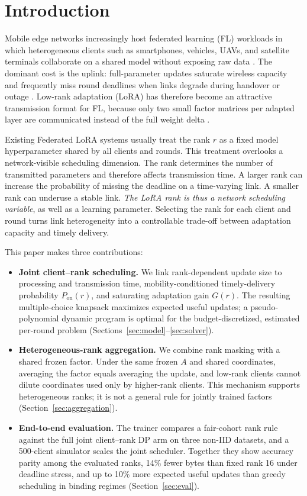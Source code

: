 \documentclass[conference]{IEEEtran}
\begin{document}
\section{Introduction}
\label{sec:intro}

Mobile edge networks increasingly host federated learning (FL) workloads in which heterogeneous clients such as smartphones, vehicles, UAVs, and satellite terminals collaborate on a shared model without exposing raw data \cite{mcmahan2017fedavg,liu2018sagin,mahboob2024ntn}. The dominant cost is the uplink: full-parameter updates saturate wireless capacity and frequently miss round deadlines when links degrade during handover or outage \cite{razmi2022ground,tang2023flsagin,qin2024dfrl,ribero2023intermittent}. Low-rank adaptation (LoRA) has therefore become an attractive transmission format for FL, because only two small factor matrices per adapted layer are communicated instead of the full weight delta \cite{hu2022lora,babakniya2023slora,zhang2024fedit}.

Existing Federated LoRA systems usually treat the rank $r$ as a fixed model hyperparameter shared by all clients and rounds. This treatment overlooks a network-visible scheduling dimension. The rank determines the number of transmitted parameters and therefore affects transmission time. A larger rank can increase the probability of missing the deadline on a time-varying link. A smaller rank can underuse a stable link. \emph{The LoRA rank is thus a network scheduling variable}, as well as a learning parameter. Selecting the rank for each client and round turns link heterogeneity into a controllable trade-off between adaptation capacity and timely delivery.

This paper makes three contributions:
\begin{itemize}
\item \textbf{Joint client--rank scheduling.} We link rank-dependent update size to processing and transmission time, mobility-conditioned timely-delivery probability $P_{\mathrm{on}}(r)$, and saturating adaptation gain $G(r)$. The resulting multiple-choice knapsack maximizes expected useful updates; a pseudo-polynomial dynamic program is optimal for the budget-discretized, estimated per-round problem (Sections~\ref{sec:model}--\ref{sec:solver}).
\item \textbf{Heterogeneous-rank aggregation.} We combine rank masking with a shared frozen factor. Under the same frozen $A$ and shared coordinates, averaging the factor equals averaging the update, and low-rank clients cannot dilute coordinates used only by higher-rank clients. This mechanism supports heterogeneous ranks; it is not a general rule for jointly trained factors (Section~\ref{sec:aggregation}).
\item \textbf{End-to-end evaluation.} The trainer compares a fair-cohort rank rule against the full joint client--rank DP arm on three non-IID datasets, and a 500-client simulator scales the joint scheduler. Together they show accuracy parity among the evaluated ranks, 14\% fewer bytes than fixed rank 16 under deadline stress, and up to 10\% more expected useful updates than greedy scheduling in binding regimes (Section~\ref{sec:eval}).
\end{itemize}
\end{document}
